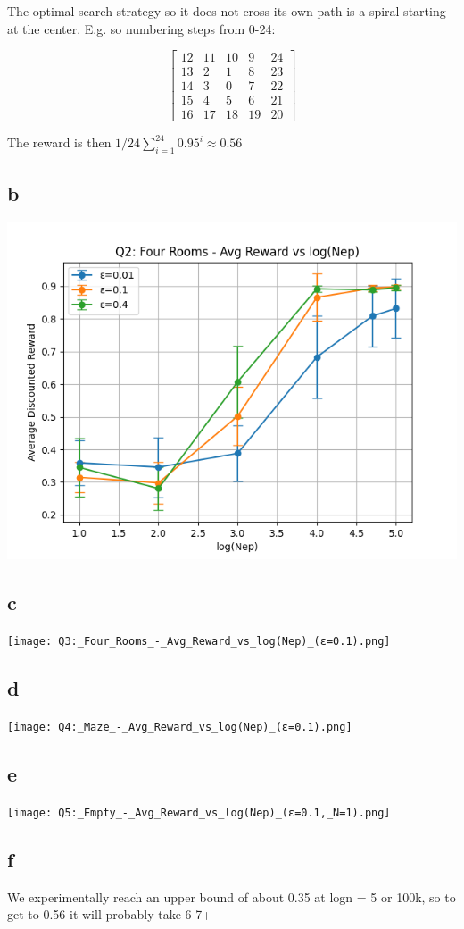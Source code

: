 \documentclass[11pt]{article}
\begin{document}
The optimal search strategy so it does not cross its own path is a spiral starting at the center. E.g. so numbering steps from 0-24:

$$
\begin{bmatrix}
    12 & 11 & 10 & 9 & 24 \\
    13 & 2 & 1 & 8 & 23 \\
    14 & 3 & 0 & 7 & 22 \\
    15 & 4 & 5 & 6 & 21 \\
    16 & 17 & 18 & 19 & 20
\end{bmatrix}
$$

The reward is then $1/24 \sum_{i=1}^{24} 0.95^i \approx 0.56$

\subsection{b}

\includegraphics{Q2:_Four_Rooms_-_Avg_Reward_vs_log(Nep).png}

\subsection{c}

\texttt{[image: Q3:\_Four\_Rooms\_-\_Avg\_Reward\_vs\_log(Nep)\_(ε=0.1).png]}

\subsection{d}

\texttt{[image: Q4:\_Maze\_-\_Avg\_Reward\_vs\_log(Nep)\_(ε=0.1).png]}

\subsection{e}

\texttt{[image: Q5:\_Empty\_-\_Avg\_Reward\_vs\_log(Nep)\_(ε=0.1,\_N=1).png]}

\subsection{f}

We experimentally reach an upper bound of about 0.35 at logn = 5 or 100k, so to get to 0.56 it will probably take 6-7+
\end{document}
